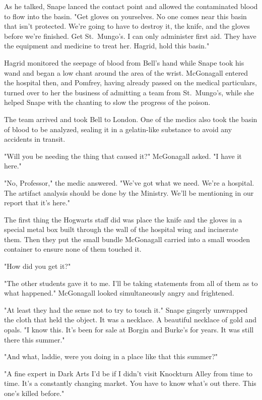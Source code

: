 As he talked, Snape lanced the contact point and allowed the contaminated blood to flow into the basin. "Get gloves on yourselves. No one comes near this basin that isn't protected. We're going to have to destroy it, the knife, and the gloves before we're finished. Get St.~Mungo's. I can only administer first aid. They have the equipment and medicine to treat her. Hagrid, hold this basin."

Hagrid monitored the seepage of blood from Bell's hand while Snape took his wand and began a low chant around the area of the wrist. McGonagall entered the hospital then, and Pomfrey, having already passed on the medical particulars, turned over to her the business of admitting a team from St.~Mungo's, while she helped Snape with the chanting to slow the progress of the poison.

The team arrived and took Bell to London. One of the medics also took the basin of blood to be analyzed, sealing it in a gelatin-like substance to avoid any accidents in transit.

"Will you be needing the thing that caused it?" McGonagall asked. "I have it here."

"No, Professor," the medic answered. "We've got what we need. We're a hospital. The artifact analysis should be done by the Ministry. We'll be mentioning in our report that it's here."

The first thing the Hogwarts staff did was place the knife and the gloves in a special metal box built through the wall of the hospital wing and incinerate them. Then they put the small bundle McGonagall carried into a small wooden container to ensure none of them touched it.

"How did you get it?"

"The other students gave it to me. I'll be taking statements from all of them as to what happened." McGonagall looked simultaneously angry and frightened.

"At least they had the sense not to try to touch it." Snape gingerly unwrapped the cloth that held the object. It was a necklace. A beautiful necklace of gold and opals. "I know this. It's been for sale at Borgin and Burke's for years. It was still there this summer."

"And what, laddie, were you doing in a place like that this summer?"

"A fine expert in Dark Arts I'd be if I didn't visit Knockturn Alley from time to time. It's a constantly changing market. You have to know what's out there. This one's killed before."


